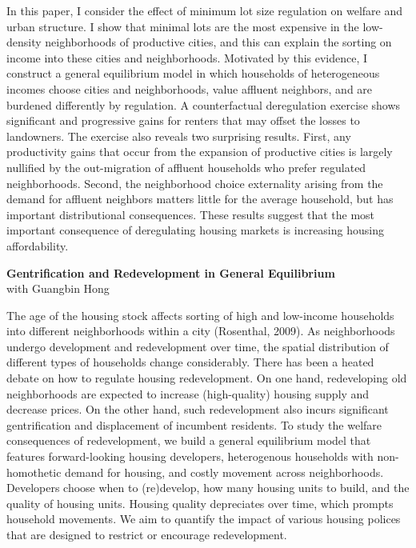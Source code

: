 \documentclass[11pt]{amsart}
\begin{document}
In this paper, I consider the effect of minimum lot size regulation on welfare and urban structure. I show that minimal lots are the most expensive in the low-density neighborhoods of productive cities, and this can explain the sorting on income into these cities and neighborhoods. Motivated by this evidence, I construct a general equilibrium model in which households of heterogeneous incomes choose cities and neighborhoods, value affluent neighbors, and are burdened differently by regulation. A counterfactual deregulation exercise shows significant and progressive gains for renters that may offset the losses to landowners. The exercise also reveals two surprising results. First, any productivity gains that occur from the expansion of productive cities is largely nullified by the out-migration of affluent households who prefer regulated neighborhoods. Second, the neighborhood choice externality arising from the demand for affluent neighbors matters little for the average household, but has important distributional consequences. These results suggest that the most important consequence of deregulating housing markets is increasing housing affordability.  \\


\bigskip
\begin{center}
\LARGE
\textbf{Gentrification and Redevelopment in General Equilibrium}\\
\large
  with Guangbin Hong
\normalsize
\end{center}
The age of the housing stock affects sorting of high and low-income households into different neighborhoods within a city (Rosenthal, 2009). As neighborhoods undergo development and redevelopment over time, the spatial distribution of different types of households change considerably. There has been a heated debate on how to regulate housing redevelopment. On one hand, redeveloping old neighborhoods are expected to increase (high-quality) housing supply and decrease prices. On the other hand, such redevelopment also incurs significant gentrification and displacement of incumbent residents. To study the welfare consequences of redevelopment, we build a general equilibrium model that features forward-looking housing developers, heterogenous households with non-homothetic demand for housing, and costly movement across neighborhoods. Developers choose when to (re)develop, how many housing units to build, and the quality of housing units. Housing quality depreciates over time, which prompts household movements. We aim to quantify the impact of various housing polices that are designed to restrict or encourage redevelopment. 
\end{document}
